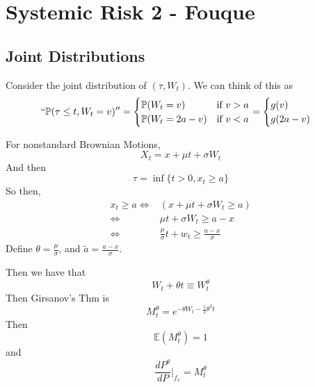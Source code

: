 \documentclass[twocolumn,openany]{book}
\begin{document}
\chapter{Systemic Risk 2 - Fouque}
\section{Joint Distributions}
Consider the joint distribution of $(\tau,W_t)$. We can think of this as
\begin{equation}
	``\mathbb{P}(\tau\leq t, W_t = v)'' = \begin{cases}
		\mathbb{P}(W_t = v) & \text{if } v > a\\
		\mathbb{P}(W_t=2a-v) & \text{if } v < a
	\end{cases} = \begin{cases}
		g(v)\\
		g(2a-v)
	\end{cases}
\end{equation}

For nonstandard Brownian Motions,
\begin{equation}
	X_t = x + \mu t + \sigma W_t
\end{equation}
And then
\begin{equation}
	\tau = \inf \{ t> 0, x_t \geq a \}
\end{equation}
So then,
\begin{align}
	x_t \geq a  \iff& (x+\mu t + \sigma W_t \geq a)\\
	\iff& \mu t + \sigma W_t \geq a-x\\
	\iff& \frac{\mu}{\sigma} t + w_t \geq \frac{a-x}{\sigma}
\end{align}
Define $\theta=\frac{\mu}{\sigma}$, and $\tilde{a}=\frac{a-x}{\sigma}$.

Then we have that
\begin{equation}
	W_t + \theta t \equiv W_t^\theta
\end{equation}
Then Girsanov's Thm is 
\begin{equation}
	M_t^\theta = e^{-\theta W_t - \frac{1}{2}\theta^2t}
\end{equation}
Then
\begin{equation}
	\mathbb{E}(M_t^\theta) = 1
\end{equation}
and
\begin{equation}
	\frac{dP^\theta}{dP}|_{f_x} = M^\theta_t
\end{equation}
\end{document}
